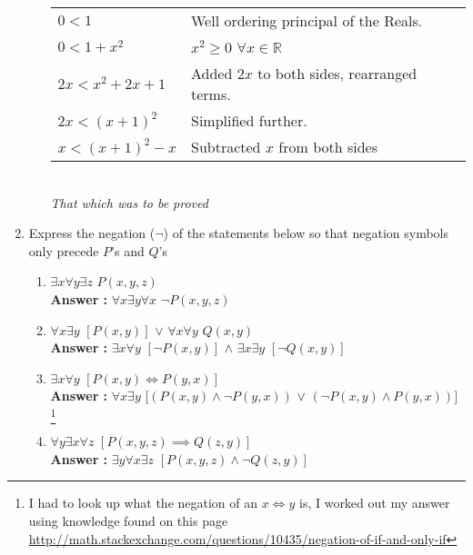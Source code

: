 \documentclass[a4paper,11pt]{article}
\newcommand{\answer}{\textbf{Answer : }}
\begin{document}
\begin{enumerate}
\begin{enumerate}
  \begin{tabular}{l | l}
   $0 < 1$                 & Well ordering principal of the Reals. \\
   $0 < 1 + x^2$           & $x^2 \geq 0$  $\forall x \in \mathbb{R}$ \\
   $2x < x^2 + 2x + 1$     & Added $2x$ to both sides, rearranged terms. \\
   $2x < (x+1)^2$          & Simplified further. \\
   $x < (x+1)^2 - x$       & Subtracted $x$ from both sides \\
  \end{tabular} \\[.2in]
  
  \emph{That which was to be proved}
  

\end{enumerate}






\item Express the negation ($\neg$) of the statements below so that negation symbols only precede $P$'s and $Q$'s

  \begin{enumerate}
  \item $\exists x \forall y \exists z$ $P(x, y , z)$ \\
  \answer $\forall x \exists y \forall x$ $\neg P(x,y,z)$

  \item $\forall x \exists y $ $[P(x,y)]$ $\vee$ $\forall x \forall y$ $Q(x, y)$ \\
  \answer $\exists x \forall y $ $[\neg P(x,y)]$ $\wedge$ $\exists x \exists y$ $[\neg Q(x, y)]$

  \item $\exists x \forall y$ $[P(x,y) \iff P(y,x)]$ \\
  \answer $\forall x \exists y$ $[(P(x,y) \wedge \neg P(y,x))$ $\vee$ $(\neg P(x,y) \wedge P(y,x))]$ \footnote{I had to look up what the negation of an $x\iff y$ is, I worked out my answer using knowledge found on this page \url{http://math.stackexchange.com/questions/10435/negation-of-if-and-only-if} }

  \item $\forall y \exists x \forall z $ $[P(x,y,z) \implies Q(z,y)]$ \\
  \answer $\exists y \forall x \exists z$ $[P(x,y,z) \wedge \neg Q(z,y)]$
  \end{enumerate}





\end{enumerate}
\end{document}
